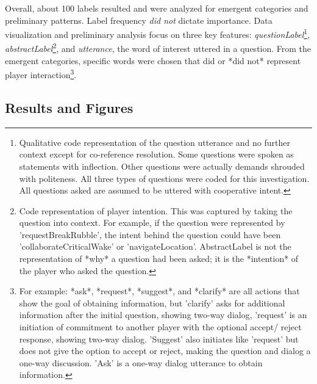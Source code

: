 Overall, about 100 labels resulted and were analyzed for
emergent categories and preliminary patterns. Label frequency \textit{did not}
dictate importance. Data visualization and preliminary analysis focus on three
key features: \textit{questionLabel}\footnote{Qualitative code representation of the
question utterance and no further context except for co-reference resolution.
Some questions were spoken as statements with inflection. Other questions were
actually demands shrouded with politeness. All three types of questions were
coded for this investigation. All questions asked are assumed to be uttered
with cooperative intent.}, \textit{abstractLabel}\footnote{Code representation of
player intention. This was captured by taking the question into context. For
example, if the question were represented by 'requestBreakRubble', the intent
behind the question could have been 'collaborateCriticalWake' or
'navigateLocation'. AbstractLabel is not the representation of *why* a
question had been asked; it is the *intention* of the player who asked the
question.}, and \textit{utterance}, the word of interest uttered in a question. From
the emergent categories, specific words were chosen that did or *did not*
represent player interaction\footnote{For example: *ask*, *request*,
*suggest*, and *clarify* are all actions that show the goal of
obtaining information, but 'clarify' asks for additional information after the
initial question, showing two-way dialog, 'request' is an initiation of
commitment to another player with the optional accept/ reject response, showing
two-way dialog. 'Suggest' also initiates like 'request' but does not give the
option to accept or reject, making the question and dialog a one-way
discussion. 'Ask' is a one-way dialog utterance to obtain information.}. 


\subsection{Results and Figures}

